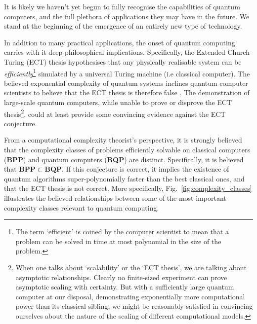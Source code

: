 \documentclass[aps,rmp,twocolumn,amsmath,amssymb,nofootinbib,superscriptaddress,longbibliography,floatfix,table-of-contents,eqsecnum]{revtex4-1}
\begin{document}
It is likely we haven't yet begun to fully recognise the capabilities of quantum computers, and the full plethora of applications they may have in the future. We stand at the beginning of the emergence of an entirely new type of technology.

In addition to many practical applications, the onset of quantum computing carries with it deep philosophical implications. Specifically, the Extended Church-Turing (ECT) thesis hypothesises that any physically realisable system can be \textit{efficiently}\footnote{The term `efficient' is coined by the computer scientist to mean that a problem can be solved in time at most polynomial in the size of the problem.} simulated by a universal Turing machine (i.e classical computer). The believed exponential complexity of quantum systems inclines quantum computer scientists to believe that the ECT thesis is therefore false \cite{bib:Deutsch85}. The demonstration of large-scale quantum computers, while unable to prove or disprove the ECT thesis\footnote{When one talks about `scalability' or the `ECT thesis', we are talking about asymptotic relationships. Clearly no finite-sized experiment can prove asymptotic scaling with certainty. But with a sufficiently large quantum computer at our disposal, demonstrating exponentially more computational power than its classical sibling, we might be reasonably satisfied in convincing ourselves about the nature of the scaling of different computational models.}, could at least provide some convincing evidence against the ECT conjecture.

From a computational complexity theorist's perspective, it is strongly believed that the complexity classes of problems efficiently solvable on classical computers (\textbf{BPP}) and quantum computers (\textbf{BQP}) are distinct. Specifically, it is believed that \mbox{$\mathbf{BPP}\subset\mathbf{BQP}$}. If this conjecture is correct, it implies the existence of quantum algorithms super-polynomially faster than the best classical ones, and that the ECT thesis is not correct. More specifically, Fig.~\ref{fig:complexity_classes} illustrates the believed relationships between some of the most important complexity classes relevant to quantum computing.
\end{document}
